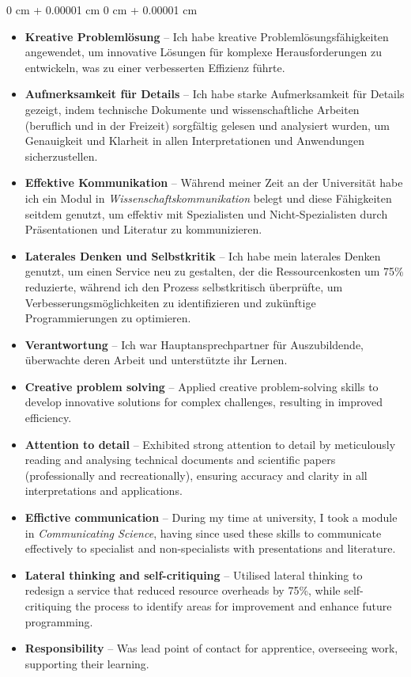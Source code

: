 \documentclass[10pt, letterpaper]{article}
\newenvironment{highlights}{
    \begin{itemize}[
        topsep=0.2 cm,
        parsep=0.2 cm,
        partopsep=0pt,
        itemsep=0.025 cm,
        leftmargin=0 cm + 10pt
    ]
}{
    \end{itemize}
}
\newenvironment{onecolentry}{
    \begin{adjustwidth}{
        0 cm + 0.00001 cm
    }{
        0 cm + 0.00001 cm
    }
}{
    \end{adjustwidth}
}
\begin{document}
        \begin{onecolentry}
            \begin{highlights}
                \ifdefined\german
                \item \textbf{Kreative Problemlösung} -- Ich habe kreative Problemlösungsfähigkeiten angewendet, um innovative Lösungen für komplexe Herausforderungen zu entwickeln, was zu einer verbesserten Effizienz führte.
                \item \textbf{Aufmerksamkeit für Details} -- Ich habe starke Aufmerksamkeit für Details gezeigt, indem technische Dokumente und wissenschaftliche Arbeiten (beruflich und in der Freizeit) sorgfältig gelesen und analysiert wurden, um Genauigkeit und Klarheit in allen Interpretationen und Anwendungen sicherzustellen.
                \item \textbf{Effektive Kommunikation} -- Während meiner Zeit an der Universität habe ich ein Modul in \textit{Wissenschaftskommunikation} belegt und diese Fähigkeiten seitdem genutzt, um effektiv mit Spezialisten und Nicht-Spezialisten durch Präsentationen und Literatur zu kommunizieren.
                \item \textbf{Laterales Denken und Selbstkritik} -- Ich habe mein laterales Denken genutzt, um einen Service neu zu gestalten, der die Ressourcenkosten um 75\% reduzierte, während ich den Prozess selbstkritisch überprüfte, um Verbesserungsmöglichkeiten zu identifizieren und zukünftige Programmierungen zu optimieren.
                \item \textbf{Verantwortung} -- Ich war Hauptansprechpartner für Auszubildende, überwachte deren Arbeit und unterstützte ihr Lernen.
                \else
                \item \textbf{Creative problem solving} -- Applied creative problem-solving skills to develop innovative solutions for complex challenges, resulting in improved efficiency.
                \item \textbf{Attention to detail} -- Exhibited strong attention to detail by meticulously reading and analysing technical documents and scientific papers (professionally and recreationally), ensuring accuracy and clarity in all interpretations and applications.
                \item \textbf{Effictive communication} -- During my time at university, I took a module in \textit{Communicating Science}, having since used these skills to communicate effectively to specialist and non-specialists with presentations and literature. 
                \item \textbf{Lateral thinking and self-critiquing} -- Utilised lateral thinking to redesign a service that reduced resource overheads by 75\%, while self-critiquing the process to identify areas for improvement and enhance future programming.
                \item \textbf{Responsibility} -- Was lead point of contact for apprentice, overseeing work, supporting their learning.
                \fi
            \end{highlights}
        \end{onecolentry}
\end{document}
